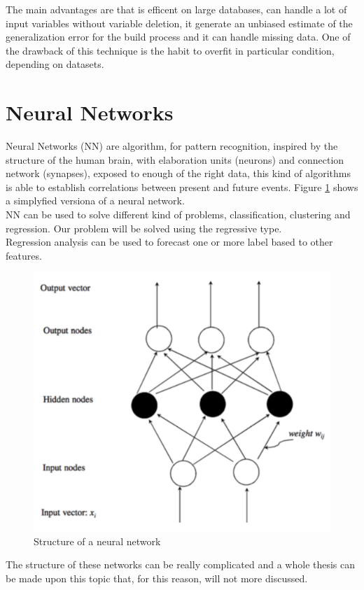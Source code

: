 \documentclass[%
    corpo=12pt,
    twoside,
    oldstyle,
    autoretitolo,
    greek,
    evenboxes,
]{toptesi}
\begin{document}
The main advantages are that is efficent on large databases, can handle a lot of input variables without variable deletion, it generate an unbiased estimate of the generalization error for the build process and it can handle missing data.
One of the drawback of this technique is the habit to overfit in particular condition, depending on datasets.


\section{Neural Networks}
Neural Networks (NN) are algorithm, for pattern recognition, inspired by the structure of the human brain, with elaboration units (neurons) and connection network (synapses), exposed to enough of the right data, this kind of algorithms is able to establish correlations between present and future events. Figure \ref{fig:nn} shows a simplyfied versiona of a neural network.\\
NN can be used to solve different kind of problems, classification, clustering and regression. Our problem will be solved using the regressive type.\\
Regression analysis can be used to forecast one or more label based to other features.
\begin{figure}[!h]
  \includegraphics[width=\linewidth]{figure/nn.png}
  \caption{Structure of a neural network}
  \label{fig:nn}
\end{figure}
The structure of these networks can be really complicated and a whole thesis can be made upon this topic that, for this reason, will not more discussed.
\end{document}
